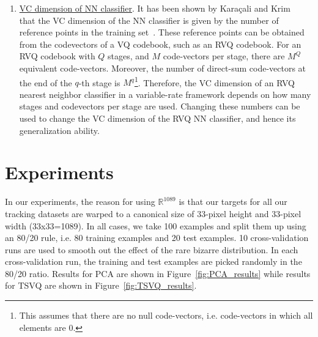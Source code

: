 \begin{enumerate}
\item \underline{VC dimension of NN classifier}.   It has been shown by Kara\c{c}ali and Krim~\cite{2003_JNL_PRML_Karacali} that the VC dimension of the NN classifier is given by the number of reference points in the training set~\cite{2005_CNF_ML_Angiulli}.  These reference points can be obtained from the codevectors of a VQ codebook, such as an RVQ codebook.  For an RVQ codebook with $Q$ stages, and $M$ code-vectors per stage, there are $M^Q$ equivalent code-vectors.  Moreover, the number of direct-sum code-vectors at the end of the $q$-th stage is $M^q$\footnote{This assumes that there are no null code-vectors, i.e. code-vectors in which all elements are 0.}.   Therefore, the VC dimension of an RVQ nearest neighbor classifier in a variable-rate framework depends on how many stages and codevectors per stage are used.  Changing these numbers can be used to change the VC dimension of the RVQ NN classifier, and hence its generalization ability.  
\end{enumerate}


\section{Experiments}
In our experiments, the reason for using $\mathbb{R}^{1089}$ is that our targets for all our tracking datasets are warped to a canonical size of 33-pixel height and 33-pixel width (33x33=1089).  In all cases, we take 100 examples and split them up using an 80/20 rule, i.e. 80 training examples and 20 test examples.  10 cross-validation runs are used to smooth out the effect of the rare bizarre distribution.  In each cross-validation run, the training and test examples are picked randomly in the 80/20 ratio.  Results for PCA are shown in Figure~\ref{fig:PCA_results} while results for TSVQ are shown in Figure~\ref{fig:TSVQ_results}.

